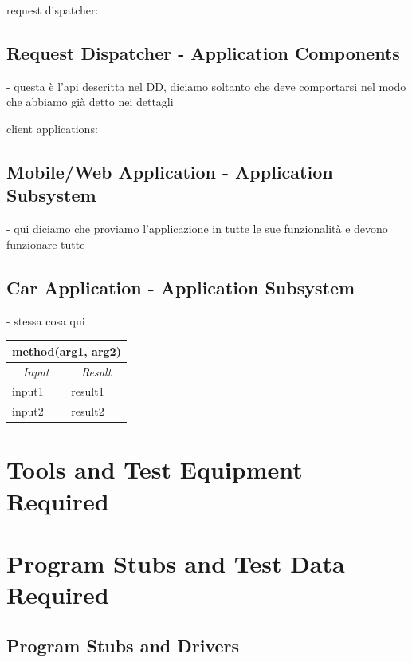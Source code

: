 \documentclass[english]{article}
\begin{document}
request dispatcher:
\subsection{Request Dispatcher - Application Components}
- questa è l'api descritta nel DD, diciamo soltanto che deve comportarsi nel modo che abbiamo già detto nei dettagli

client applications:
\subsection{Mobile/Web Application - Application Subsystem}
- qui diciamo che proviamo l'applicazione in tutte le sue funzionalità e devono funzionare tutte

\subsection{Car Application - Application Subsystem}
- stessa cosa qui

\begin{center}

	\begin{tabular}{ | p{6cm} | p{6cm} | }
		\hline 


		\hline

		\multicolumn{2}{|c|}{\textbf{method(arg1, arg2)}} \\
		\hline
		\multicolumn{1}{|c|}{\textit{Input}} & \multicolumn{1}{c|}{\textit{Result}} \\
		\hline
		input1 & result1 \\
		\hline
		input2 & result2 \\
		\hline
	\end{tabular}
\end{center}

\section{Tools and Test Equipment Required}

\section{Program Stubs and Test Data Required}

\subsection{Program Stubs and Drivers}
\end{document}
